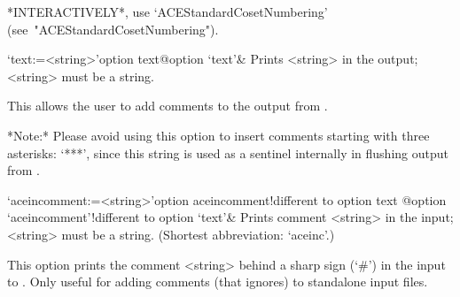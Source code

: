 *INTERACTIVELY*,            use            `ACEStandardCosetNumbering'
(see~"ACEStandardCosetNumbering").

\enditems


\beginitems

\>`text:=<string>'{option text}@{option `text'}&
Prints <string> in the output; <string> must be a string.

This allows the user to add comments to the output from {\ACE}.

*Note:*
Please avoid using this option to insert comments starting with  three
asterisks: `***', since this string is used as a  sentinel  internally
in flushing output from {\ACE}.

\>`aceincomment:=<string>'{option aceincomment!different to option text}%
@{option `aceincomment'!different to option `text'}&
Prints comment <string> in the {\ACE} input; <string> must be a string.
(Shortest abbreviation: `aceinc'.)

This option prints the comment <string> behind a sharp sign (`\#')  in
the input to {\ACE}. Only useful  for  adding  comments  (that  {\ACE}
ignores) to standalone input files.

\enditems

